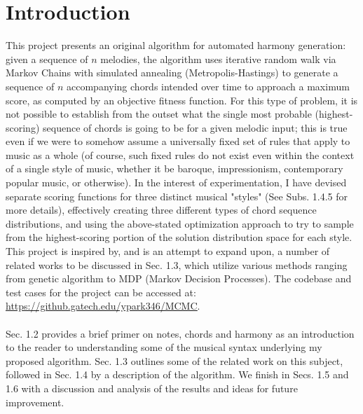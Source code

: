 \documentclass[twoside]{article}
\newcommand{\myul}[2][black]{\setulcolor{#1}\ul{#2}\setulcolor{black}}
\begin{document}
	

	\section{Introduction}
	This project presents an original algorithm for automated harmony generation: given a sequence of $n$ melodies, the algorithm uses iterative random walk via Markov Chains with simulated annealing (Metropolis-Hastings) to generate a sequence of $n$ accompanying chords intended over time to approach a maximum score, as computed by an objective fitness function. For this type of problem, it is not possible to establish from the outset what the single most probable (highest-scoring) sequence of chords is going to be for a given melodic input; this is true even if we were to somehow assume a universally fixed set of rules that apply to music as a whole (of course, such fixed rules do not exist even within the context of a single style of music, whether it be baroque, impressionism, contemporary popular music, or otherwise). In the interest of experimentation, I have devised separate scoring functions for three distinct musical "styles" (See Subs. 1.4.5 for more details), effectively creating three different types of chord sequence distributions, and using the above-stated optimization approach to try to sample from the highest-scoring portion of the solution distribution space for each style. This project is inspired by, and is an attempt to expand upon, a number of related works to be discussed in Sec. 1.3, which utilize various methods ranging from genetic algorithm to MDP (Markov Decision Processes). The codebase and test cases for the project can be accessed at: \href{https://github.gatech.edu/ypark346/MCMC}{\color{blue} \myul[blue] {https://github.gatech.edu/ypark346/MCMC}}.
	\\\\
	Sec. 1.2 provides a brief primer on notes, chords and harmony as an introduction to the reader to understanding some of the musical syntax underlying my proposed algorithm. Sec. 1.3 outlines some of the related work on this subject, followed in Sec. 1.4 by a description of the algorithm. We finish in Secs. 1.5 and 1.6 with a discussion and analysis of the results and ideas for future improvement.
\end{document}
